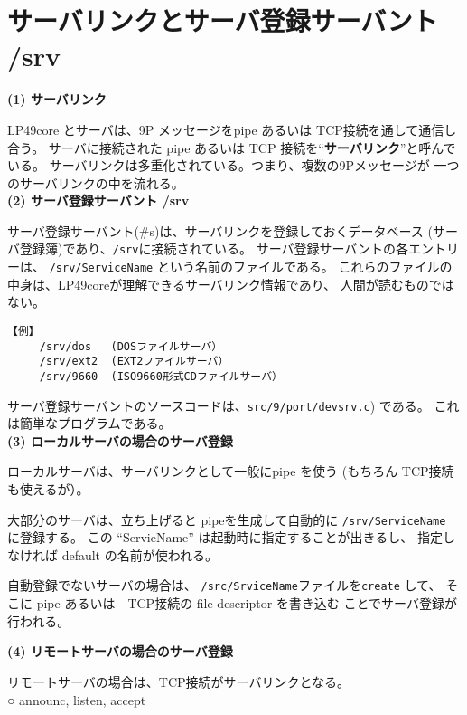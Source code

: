     
\section{サーバリンクとサーバ登録サーバント /srv }

{\bf\flushleft (1) サーバリンク}

  LP49core とサーバは、9P メッセージをpipe あるいは TCP接続を通して通信し合う。
  サーバに接続された pipe あるいは TCP 接続を``{\bf サーバリンク}''と呼んでいる。
  サーバリンクは多重化されている。つまり、複数の9Pメッセージが
  一つのサーバリンクの中を流れる。
\\

{\bf\flushleft (2) サーバ登録サーバント /srv}

サーバ登録サーバント(\#s)は、サーバリンクを登録しておくデータベース
(サーバ登録簿)であり、{\tt /srv}に接続されている。
サーバ登録サーバントの各エントリーは、
{\tt /srv/ServiceName} という名前のファイルである。
これらのファイルの中身は、LP49coreが理解できるサーバリンク情報であり、
人間が読むものではない。
\begin{verbatim}
【例】 
     /srv/dos   (DOSファイルサーバ）
     /srv/ext2  (EXT2ファイルサーバ）
     /srv/9660  (ISO9660形式CDファイルサーバ）

\end{verbatim}

 サーバ登録サーバントのソースコードは、{\tt src/9/port/devsrv.c}) である。
これは簡単なプログラムである。
\\

{\bf\flushleft (3) ローカルサーバの場合のサーバ登録}

ローカルサーバは、サーバリンクとして一般にpipe を使う
(もちろん TCP接続も使えるが）。

大部分のサーバは、立ち上げると pipeを生成して自動的に {\tt /srv/ServiceName}
に登録する。
この ``ServieName'' は起動時に指定することが出きるし、
指定しなければ default の名前が使われる。

自動登録でないサーバの場合は、
{\tt /src/SrviceName}ファイルを{\tt create} して、
そこに pipe あるいは　TCP接続の file descriptor を書き込む
ことでサーバ登録が行われる。

\vspace{4cm}


{\bf\flushleft (4) リモートサーバの場合のサーバ登録}

リモートサーバの場合は、TCP接続がサーバリンクとなる。
\\

○  announc, listen, accept

